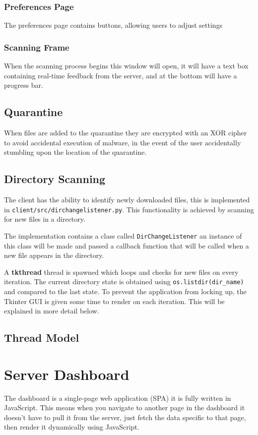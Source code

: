 \subsubsection{Preferences Page}
The preferences page contains buttons, allowing users to adjust settings 

\subsubsection{Scanning Frame}
When the scanning process begins this window will open, it will have a text box containing real-time feedback from the server, and at the bottom will have a progress bar.

\subsection{Quarantine}
When files are added to the quarantine they are encrypted with an XOR cipher to avoid accidental execution of malware, in the event of the user accidentally stumbling upon the location of the quarantine.

\subsection{Directory Scanning}
The client has the ability to identify newly downloaded files,
this is implemented in \texttt{client/src/dirchangelistener.py}.
This functionality is achieved by scanning for new files in a directory.

The implementation contains a class called \texttt{DirChangeListener}
an instance of this class will be made and passed a callback function that
will be called when a new file appears in the directory.

A \textbf{tkthread} thread is spawned which loops
and checks for new files on every iteration.
The current directory state is obtained using
\texttt{os.listdir(dir\_name)} and compared to the last state.
To prevent the application from locking up,
the Tkinter GUI is given some time to render on each iteration.
This will be explained in more detail below.

\subsection{Thread Model}

\section{Server Dashboard}
The dashboard is a single-page web application (SPA)
it is fully written in JavaScript.
This means when you navigate to another page in the dashboard
it doesn't have to pull it from the server,
just fetch the data specific to that page,
then render it dynamically using JavaScript.

